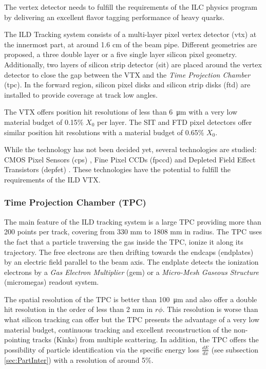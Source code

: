 The vertex detector needs to fulfill the requirements of the ILC physics program by delivering an excellent flavor tagging performance of heavy quarks.

The ILD Tracking system consists of a multi-layer pixel vertex detector (\acrshort{vtx}) at the innermost part, at around 1.6 cm of the beam pipe. Different geometries are proposed, a three double layer or a five single layer silicon pixel geometry. Additionally, two layers of silicon strip detector (\acrshort{sit}) are placed around the vertex detector to close the gap between the VTX and the \textit{Time Projection Chamber} (\acrshort{tpc}). In the forward region, silicon pixel disks and silicon strip disks (\acrshort{ftd}) are installed to provide coverage at track low angles.

The VTX offers position hit resolutions of less than \SI{6}{\micro\meter} \cite{ILC_TDR_Vol4} with a very low material budget of 0.15\% $X_0$ per layer. The SIT and FTD pixel detectors offer similar position hit resolutions with a material budget of 0.65\% $X_0$.

While the technology has not been decided yet, several technologies are studied: CMOS Pixel Sensors (\acrshort{cps}) \cite{Winter:2012ms}, Fine Pixel CCDs (\acrshort{fpccd}) \cite{Murai:2016taa} and Depleted Field Effect Transistors (\acrshort{depfet}) \cite{Boronat:2016cog}. These technologies have the potential to fulfill the requirements of the ILD VTX.

\subsubsection{Time Projection Chamber (TPC)}

The main feature of the ILD tracking system is a large TPC providing more than 200 points per track, covering from 330 mm to 1808 mm in radius. The TPC uses the fact that a particle traversing the gas inside the TPC, ionize it along its trajectory. The free electrons are then drifting towards the endcaps (endplates) by an electric field parallel to the beam axis. The endplate detects the ionization electrons by a \textit{Gas Electron Multiplier} (\acrshort{gem}) \cite{Sauli:1997qp} or a \textit{Micro-Mesh Gaseous Structure} (\acrshort{micromegas}) \cite{Giomataris:1995fq} readout system.

The spatial resolution of the TPC is better than \SI{100}{\micro\meter} \cite{Mueller:301339} and also offer a double hit resolution in the order of less than 2 mm in $r\phi$. This resolution is worse than what silicon tracking can offer but the TPC presents the advantage of a very low material budget, continuous tracking and excellent reconstruction of the non-pointing tracks (Kinks) from multiple scattering. In addition, the TPC offers the possibility of particle identification via the specific energy loss $\frac{dE}{dx}$ (see subsection \ref{sec:PartInter}) with a resolution of around 5\%.

